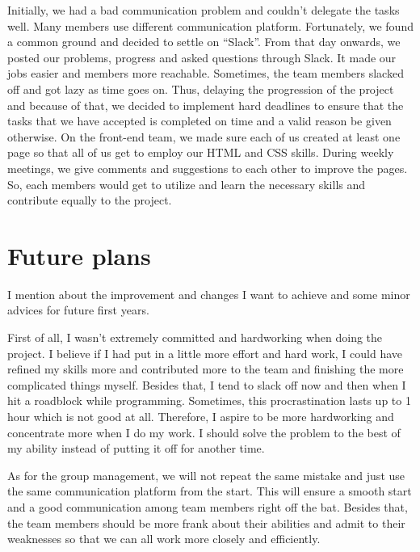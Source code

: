 \documentclass[a4paper]{article}
\begin{document}
Initially, we had a bad communication problem and couldn’t delegate the tasks well. Many members use different communication platform. Fortunately, we found a common ground and decided to settle on “Slack”. From that day onwards, we posted our problems, progress and asked questions through Slack. It made our jobs easier and members more reachable. Sometimes, the team members slacked off and got lazy as time goes on. Thus, delaying the progression of the project and because of that, we decided to implement hard deadlines to ensure that the tasks that we have accepted is completed on time and a valid reason be given otherwise. On the front-end team, we made sure each of us created at least one page so that all of us get to employ our HTML and CSS skills. During weekly meetings, we give comments and suggestions to each other to improve the pages. So, each members would get to utilize and learn the necessary skills and contribute equally to the project. 
\newpage

\section{Future plans}\newline
I mention about the improvement and changes I want to achieve and some minor advices for future first years. 
\newline

First of all, I wasn’t extremely committed and hardworking when doing the project. I believe if I had put in a little more effort and hard work, I could have refined my skills more and contributed more to the team and finishing the more complicated things myself. Besides that, I tend to slack off now and then when I hit a roadblock while programming. Sometimes, this procrastination lasts up to 1 hour which is not good at all. Therefore, I aspire to be more hardworking and concentrate more when I do my work. I should solve the problem to the best of my ability instead of putting it off for another time.
\newline

As for the group management, we will not repeat the same mistake and just use the same communication platform from the start. This will ensure a smooth start and a good communication among team members right off the bat. Besides that, the team members should be more frank about their abilities and admit to their weaknesses so that we can all work more closely and efficiently.  
\newline
\end{document}
